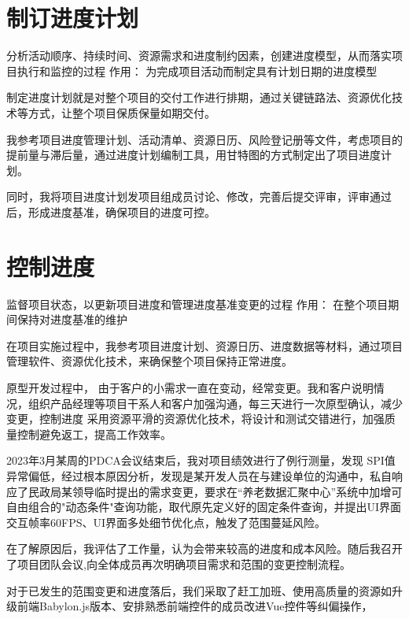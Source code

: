 \documentclass[UTF8]{../computerUniverse}
\begin{document}
\section{制订进度计划}

分析活动顺序、持续时间、资源需求和进度制约因素，创建进度模型，从而落实项目执行和监控的过程
作用：
为完成项目活动而制定具有计划日期的进度模型


制定进度计划就是对整个项目的交付工作进行排期，通过关键链路法、资源优化技术等方式，让整个项目保质保量如期交付。

我参考项目进度管理计划、活动清单、资源日历、风险登记册等文件，考虑项目的提前量与滞后量，通过进度计划编制工具，用甘特图的方式制定出了项目进度计划。

同时，我将项目进度计划发项目组成员讨论、修改，完善后提交评审，评审通过后，形成进度基准，确保项目的进度可控。





\section{控制进度}
监督项目状态，以更新项目进度和管理进度基准变更的过程
作用：
在整个项目期间保持对进度基准的维护

在项目实施过程中，我参考项目进度计划、资源日历、进度数据等材料，通过项目管理软件、资源优化技术，来确保整个项目保持正常进度。


原型开发过程中，
由于客户的小需求一直在变动，经常变更。我和客户说明情况，组织产品经理等项目干系人和客户加强沟通，每三天进行一次原型确认，减少变更，控制进度
采用资源平滑的资源优化技术，将设计和测试交错进行，加强质量控制避免返工，提高工作效率。

2023年3月某周的PDCA会议结束后，我对项目绩效进行了例行测量，发现 SPI值异常偏低，经过根本原因分析，发现是某开发人员在与建设单位的沟通中，私自响应了民政局某领导临时提出的需求变更，要求在“养老数据汇聚中心”系统中加增可自由组合的"动态条件"查询功能，取代原先定义好的固定条件查询，并提出UI界面交互帧率60FPS、UI界面多处细节优化点，触发了范围蔓延风险。

在了解原因后，我评估了工作量，认为会带来较高的进度和成本风险。随后我召开了项目团队会议,向全体成员再次明确项目需求和范围的变更控制流程。

对于已发生的范围变更和进度落后，我们采取了赶工加班、使用高质量的资源如升级前端Babylon.js版本、安排熟悉前端控件的成员改进Vue控件等纠偏操作，
\end{document}
